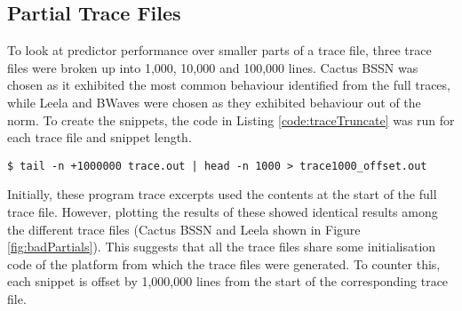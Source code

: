 \clearpage
\subsection{Partial Trace Files}
To look at predictor performance over smaller parts of a trace file, three trace files were broken up into 1,000, 10,000 and 100,000 lines. Cactus BSSN was chosen as it exhibited the most common behaviour identified from the full traces, while Leela and BWaves were chosen as they exhibited behaviour out of the norm. To create the snippets, the code in Listing \ref{code:traceTruncate} was run for each trace file and snippet length.

\noindent\begin{minipage}{\linewidth}
    \begin{lstlisting}[caption={Truncating a trace to 1,000 lines with 1,000,000 offset}, label={code:traceTruncate}, frame=single]
    $ tail -n +1000000 trace.out | head -n 1000 > trace1000_offset.out
\end{lstlisting}
\end{minipage}

Initially, these program trace excerpts used the contents at the start of the full trace file. However, plotting the results of these showed identical results among the different trace files (Cactus BSSN and Leela shown in Figure \ref{fig:badPartials}). This suggests that all the trace files share some initialisation code of the platform from which the trace files were generated. To counter this, each snippet is offset by 1,000,000 lines from the start of the corresponding trace file.

